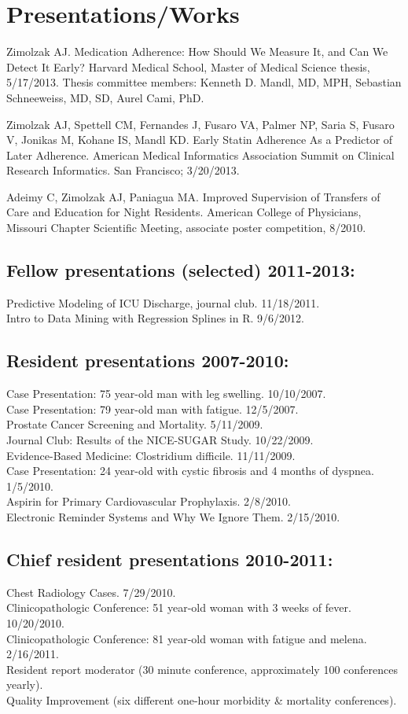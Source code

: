 \documentclass[12pt]{article}
\begin{document}
\section{Presentations/Works}
Zimolzak AJ. Medication Adherence: How Should We Measure It, and Can
We Detect It Early? Harvard Medical School, Master of Medical Science
thesis, 5/17/2013. Thesis committee members: Kenneth D. Mandl, MD,
MPH, Sebastian Schneeweiss, MD, SD, Aurel Cami, PhD.

Zimolzak AJ, Spettell CM, Fernandes J, Fusaro VA, Palmer NP, Saria S,
Fusaro V, Jonikas M, Kohane IS, Mandl KD. Early Statin Adherence As a
Predictor of Later Adherence. American Medical Informatics Association
Summit on Clinical Research Informatics. San Francisco; 3/20/2013.

Adeimy C, Zimolzak AJ, Paniagua MA. Improved Supervision of Transfers
of Care and Education for Night Residents. American College of
Physicians, Missouri Chapter Scientific Meeting, associate poster
competition, 8/2010.

\subsection{Fellow presentations (selected) 2011-2013:}
Predictive Modeling of ICU Discharge, journal club. 11/18/2011.\\
Intro to Data Mining with Regression Splines in R. 9/6/2012.

\subsection{Resident presentations 2007-2010:}
Case Presentation: 75 year-old man with leg swelling. 10/10/2007.\\
Case Presentation: 79 year-old man with fatigue. 12/5/2007.\\
Prostate Cancer Screening and Mortality. 5/11/2009.\\
Journal Club: Results of the NICE-SUGAR Study. 10/22/2009.\\
Evidence-Based Medicine: Clostridium difficile. 11/11/2009.\\
Case Presentation: 24 year-old with cystic fibrosis and 4 months of
dyspnea. 1/5/2010.\\
Aspirin for Primary Cardiovascular Prophylaxis. 2/8/2010.\\
Electronic Reminder Systems and Why We Ignore Them. 2/15/2010.

\subsection{Chief resident presentations 2010-2011:}
Chest Radiology Cases. 7/29/2010.\\
Clinicopathologic Conference: 51 year-old woman with 3 weeks of fever.
10/20/2010.\\
Clinicopathologic Conference: 81 year-old woman with fatigue and
melena. 2/16/2011.\\
Resident report moderator (30 minute conference, approximately 100
conferences yearly).\\
Quality Improvement (six different one-hour morbidity \& mortality
conferences).\\
\end{document}
